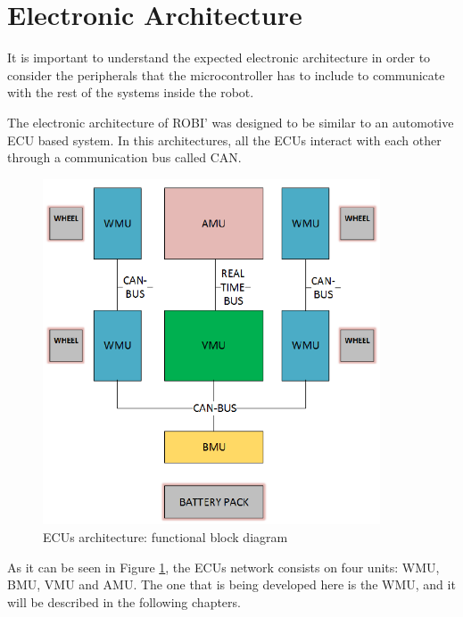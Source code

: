 \section{Electronic Architecture}

It is important to understand the expected electronic architecture in order to consider the peripherals that the microcontroller has to include to communicate with the rest of the systems inside the robot.

The electronic architecture of ROBI' was designed to be similar to an automotive \acf{ECU} based system. In this architectures, all the \ac{ECU}s interact with each other through a communication bus called \acf{CAN}.

\begin{figure}[htbp]
\centering
\includegraphics[width=10cm]{Images/ecus.png} 
\caption[ECUs architecture]{ECUs architecture: functional block diagram}
\label{fig:ecus}
\end{figure}

As it can be seen in Figure \ref{fig:ecus}, the \ac{ECU}s network consists on four units: \acf{WMU}, \acf{BMU}, \acf{VMU} and \acf{AMU}. The one that is being developed here is the \ac{WMU}, and it will be described in the following chapters.